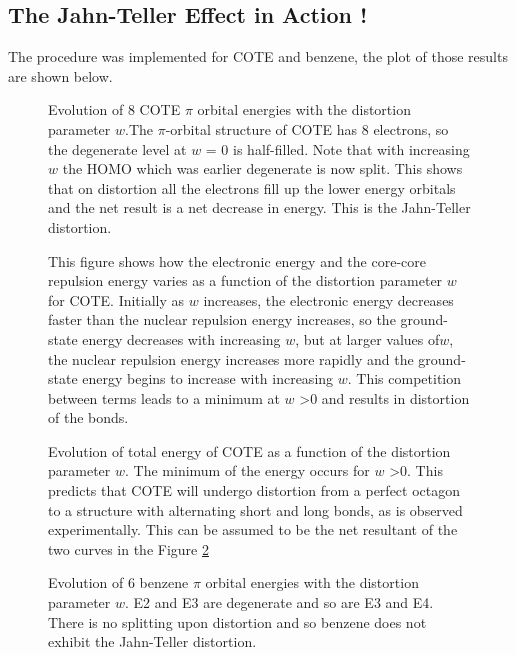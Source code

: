 \documentclass[9pt,twocolumn,twoside]{optica}
\begin{document}
\subsection{The Jahn-Teller Effect in Action !}
The procedure was implemented for COTE and benzene, the plot of those results are shown below.

\begin{figure}[H]
\centering
{}
\caption{Evolution of 8 COTE $\pi$ orbital energies with the distortion parameter $w$.The $\pi$-orbital structure of COTE has 8 electrons, so the degenerate level at $w$ = 0 is half-filled. Note that with increasing $w$  the HOMO which was earlier degenerate is now split. This shows that on distortion all the electrons fill up the lower energy orbitals and the net result is a net decrease in energy. This is the Jahn-Teller distortion. }
\label{fig:MO_levels_cote}
\end{figure}



\begin{figure}[H]
\centering
{}
\caption{This figure shows how the electronic energy and the core-core repulsion energy varies as a function of the distortion parameter $w$ for COTE. Initially as  $w$ increases, the electronic energy decreases faster than the nuclear repulsion energy increases, so the ground-state energy decreases with increasing $w$, but at larger values of$ w$, the nuclear repulsion energy increases more rapidly and the
ground-state energy begins to increase with increasing $w$. This
competition between terms leads to a minimum at $w$ >0 and results in distortion of the bonds.  }
\label{fig:cote_both}
\end{figure}


\begin{figure}[H]
\centering
{}
\caption{Evolution of total energy of COTE as a function of the distortion parameter $w$. The minimum of the energy occurs for $w$ >0. This predicts that COTE will undergo distortion from a perfect octagon to a structure with alternating short and long bonds, as is observed experimentally. This can be assumed to be the net resultant of the two curves in the Figure \ref{fig:cote_both} }
\label{fig:cote_total}
\end{figure}



\begin{figure}[H]
\centering
{}
\caption{Evolution of 6 benzene $\pi$ orbital energies with the distortion parameter $w$. E2 and E3 are degenerate and so are E3 and E4. There is no splitting upon distortion and so benzene does not exhibit the Jahn-Teller distortion.}
\label{fig:MO_levels_ben}
\end{figure}
\end{document}

